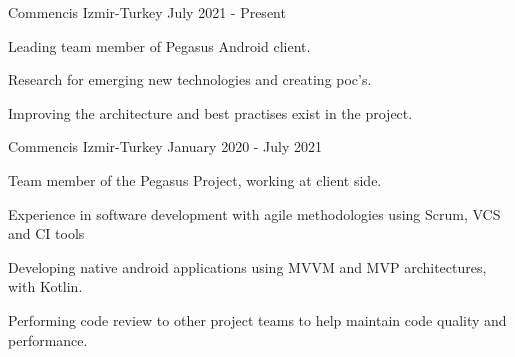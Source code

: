 

\begin{cventries}
{Commencis}
{Izmir-Turkey}
{July 2021 - Present }
{
  \begin{cvitems}
    \item {Leading team member of Pegasus Android client.}
    \item {Research for emerging new technologies and creating poc's.}
    \item {Improving the architecture and best practises exist in the project.}
  \end{cvitems}
}
{Commencis}
{Izmir-Turkey}
{January 2020 - July 2021 }
{
  \begin{cvitems}
    \item {Team member of the Pegasus Project, working at client side. }
    \item {Experience in software development with agile methodologies using Scrum, VCS and CI tools }
    \item {Developing native android applications using MVVM and MVP architectures, with Kotlin.}
    \item {Performing code review to other project teams to help maintain code quality and performance.}
  \end{cvitems}
}

\end{cventries}
